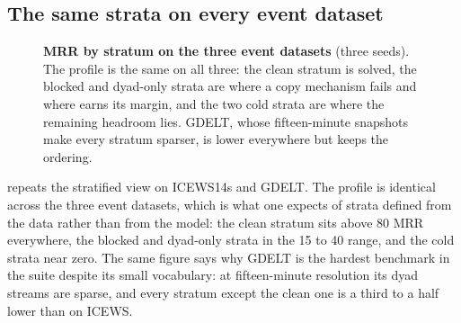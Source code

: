 \subsection{The same strata on every event dataset}

\begin{figure}[t]
  \centering
  \caption{\textbf{MRR by stratum on the three event datasets} (three seeds). The profile is the same on all three: the clean stratum is solved, the blocked and dyad-only strata are where a copy mechanism fails and where \model{} earns its margin, and the two cold strata are where the remaining headroom lies. GDELT, whose fifteen-minute snapshots make every stratum sparser, is lower everywhere but keeps the ordering.}
  \label{fig:strata-results}
\end{figure}

 repeats the stratified view on ICEWS14s and GDELT. The profile is identical across the three event datasets, which is what one expects of strata defined from the data rather than from the model: the clean stratum sits above 80 MRR everywhere, the blocked and dyad-only strata in the 15 to 40 range, and the cold strata near zero. The same figure says why GDELT is the hardest benchmark in the suite despite its small vocabulary: at fifteen-minute resolution its dyad streams are sparse, and every stratum except the clean one is a third to a half lower than on ICEWS.

